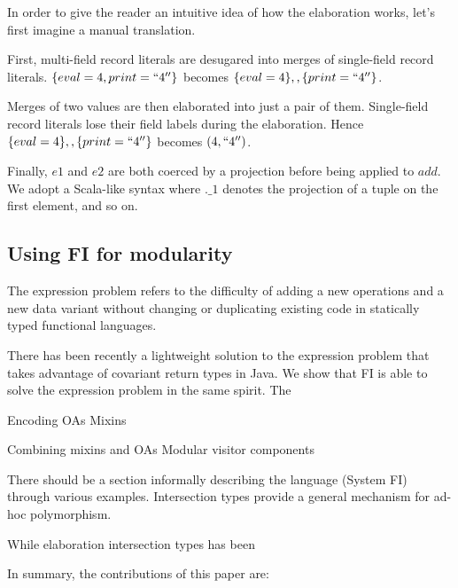 \documentclass[preprint]{sigplanconf}
\begin{document}

In order to give the reader an intuitive idea of how the elaboration works,
let's first imagine a manual translation.

First, multi-field record literals are desugared into merges of single-field
record literals. $ \{ eval = 4, print = ``4'' \} $ becomes
$ \{ eval = 4 \} ,, \{ print = ``4'' \} $.

Merges of two values are then elaborated into just a pair of them. Single-field
record literals lose their field labels during the elaboration. Hence
$ \{ eval = 4 \} ,, \{ print = ``4'' \} $ becomes $ (4, ``4'') $.

Finally, $ e1 $ and $ e2 $ are both coerced by a projection before being applied
to $ add $. We adopt a Scala-like syntax where $ .\_1 $ denotes the projection
of a tuple on the first element, and so on.


\subsection{Using FI for modularity}


The expression problem refers to the difficulty of adding a new operations and a
new data variant without changing or duplicating existing code in statically
typed functional languages.

There has been recently a lightweight solution to the expression problem that
takes advantage of covariant return types in Java. We show that FI is able to
solve the expression problem in the same spirit. The

Encoding OAs
Mixins



Combining mixins and OAs
Modular visitor components


There should be a section informally describing the language (System FI) through
various examples. Intersection types provide a general mechanism for ad-hoc
polymorphism.

While elaboration intersection types has been

In summary, the contributions of this paper are:
\end{document}

